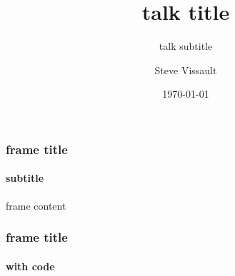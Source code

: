 \documentclass[10pt,aspectratio=149]{beamer}
\author{Steve Vissault}
\title{talk title}
\subtitle{talk subtitle}
\date{\today}
\institute{talk location}
\begin{document}
\begin{frame}[plain]
   \titlepage
\end{frame}

\begin{frame}
   \frametitle{frame title}
   \framesubtitle{subtitle}

   frame content
   
\end{frame}

\begin{frame}[fragile]
   \frametitle{frame title}
   \framesubtitle{with code}


\end{frame}
\end{document}
